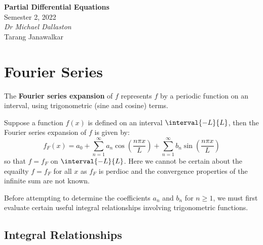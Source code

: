 \documentclass{article}
\date{}
\newcommand{\unitName}{Partial Differential Equations}
\newcommand{\unitTime}{Semester 2, 2022}
\newcommand{\unitCoordinator}{Dr Michael Dallaston}
\newcommand{\documentAuthors}{Tarang Janawalkar}
\begin{document}
%
\begin{titlepage}
    \vspace*{\fill}
    \begin{center}
        \LARGE{\textbf{\unitName}} \\[0.1in]
        \normalsize{\unitTime} \\[0.2in]
        \normalsize\textit{\unitCoordinator} \\[0.2in]
        \documentAuthors
    \end{center}
    \vspace*{\fill}
    \doclicenseThis
    \thispagestyle{empty}
\end{titlepage}
\newpage
%
\tableofcontents
\newpage
%
\section{Fourier Series}
\begin{definition}
    The \textbf{Fourier series expansion} of \(f\) represents \(f\) by a periodic function on an interval, using trigonometric (sine and cosine) terms.

    Suppose a function \(f\left( x \right)\) is defined on an interval \(\interval{-L}{L}\), then
    the Fourier series expansion of \(f\) is given by:
    \begin{equation}\label{eq:fourier}
        f_F\left( x \right) = a_0 + \sum_{n = 1}^\infty a_n \cos{\left( \frac{n \pi x}{L} \right)} + \sum_{n = 1}^\infty b_n \sin{\left( \frac{n \pi x}{L} \right)}
    \end{equation}
    so that \(f = f_F\) on \(\interval{-L}{L}\). Here we cannot be certain about the equailty \(f = f_F\) for all \(x\) as \(f_F\) is perdioc and the convergence properties of the infinite sum are not known.
\end{definition}
Before attempting to determine the coefficients \(a_n\) and \(b_n\) for \(n \geq 1\), we must first evaluate certain useful integral relationships involving trigonometric functions.
\subsection{Integral Relationships}
\end{document}
